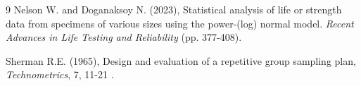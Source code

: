 \documentclass[twoside]{article}
\begin{document}
\begin{thebibliography}{9}
 Nelson W. and Doganaksoy N. (2023), Statistical analysis of life or strength data from specimens of various
sizes using the power-(log) normal model. {\it Recent Advances in Life Testing and Reliability} (pp. 377-408).



  Sherman R.E. (1965), Design and evaluation of a repetitive group sampling plan, {\it Technometrics},  7, 11-21 .





\end{thebibliography}
 
\end{document}
